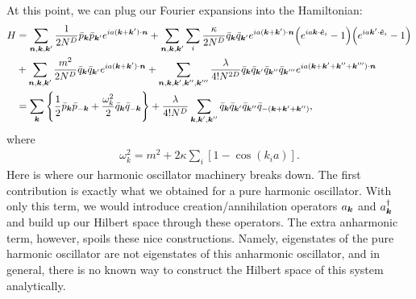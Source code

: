 {At this point, we can plug our Fourier expansions into the Hamiltonian:
\begin{align}
    H &= \sum_{\vb*{n},\vb*{k},\vb*{k}'} \frac{1}{2 N^{D}} \bar{p}_{\vb*{k}} \bar{p}_{\vb*{k}'} e^{ia(\vb*{k} + \vb*{k}') \cdot \vb*{n}} + \sum_{\vb*{n},\vb*{k},\vb*{k}'} \sum_{i} \frac{\kappa}{2 N^{D}} \bar{q}_{\vb*{k}} \bar{q}_{\vb*{k}'} e^{ia(\vb*{k} + \vb*{k}') \cdot \vb*{n}} \Big( e^{i a \vb*{k} \cdot \vu*{e}_{i}} - 1 \Big) \Big( e^{i a \vb*{k}' \cdot \vu*{e}_{i}} - 1 \Big) \nonumber \\
    &+ \sum_{\vb*{n},\vb*{k},\vb*{k}'} \frac{m^2}{2 N^{D}} \bar{q}_{\vb*{k}} \bar{q}_{\vb*{k}'} e^{ia(\vb*{k} + \vb*{k}') \cdot \vb*{n}} + \sum_{\vb*{n},\vb*{k},\vb*{k}',\vb*{k}'',\vb*{k}'''} \frac{\lambda}{4! N^{2D}} \bar{q}_{\vb*{k}} \bar{q}_{\vb*{k}'} \bar{q}_{\vb*{k}''} \bar{q}_{\vb*{k}'''} e^{ia(\vb*{k} + \vb*{k}' + \vb*{k}'' + \vb*{k}''') \cdot \vb*{n}} \nonumber \\
    &= \sum_{\vb*{k}} \Bigg\{ \frac{1}{2} \bar{p}_{\vb*{k}} \bar{p}_{-\vb*{k}} + \frac{\omega_{k}^2}{2} \bar{q}_{\vb*{k}} \bar{q}_{-\vb*{k}} \Bigg\} + \frac{\lambda}{4! N^{D}} \sum_{\vb*{k},\vb*{k}',\vb*{k}''} \bar{q}_{\vb*{k}} \bar{q}_{\vb*{k}'} \bar{q}_{\vb*{k}''} \bar{q}_{-(\vb*{k} + \vb*{k}' + \vb*{k}'')}
,\end{align}
where
\begin{align}
    \omega_{k}^2 = m^2 + 2 \kappa \sum_{i} [1 - \cos(k_{i} a)]
.\end{align}
Here is where our harmonic oscillator machinery breaks down.
The first contribution is exactly what we obtained for a pure harmonic oscillator.
With only this term, we would introduce creation/annihilation operators $a_{\vb*{k}}$ and $a_{\vb*{k}}^{\dagger}$ and build up our Hilbert space through these operators.
The extra anharmonic term, however, spoils these nice constructions.
Namely, eigenstates of the pure harmonic oscillator are not eigenstates of this anharmonic oscillator, and in general, there is no known way to construct the Hilbert space of this system analytically.

}
